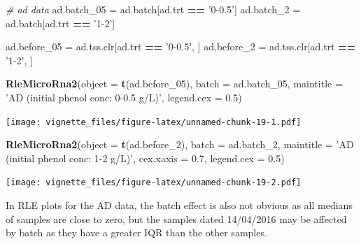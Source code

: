 \documentclass[]{book}
\newenvironment{Shaded}{\begin{snugshade}}{\end{snugshade}}
\newcommand{\KeywordTok}[1]{\textcolor[rgb]{0.13,0.29,0.53}{\textbf{#1}}}
\newcommand{\DataTypeTok}[1]{\textcolor[rgb]{0.13,0.29,0.53}{#1}}
\newcommand{\DecValTok}[1]{\textcolor[rgb]{0.00,0.00,0.81}{#1}}
\newcommand{\FloatTok}[1]{\textcolor[rgb]{0.00,0.00,0.81}{#1}}
\newcommand{\StringTok}[1]{\textcolor[rgb]{0.31,0.60,0.02}{#1}}
\newcommand{\CommentTok}[1]{\textcolor[rgb]{0.56,0.35,0.01}{\textit{#1}}}
\newcommand{\OperatorTok}[1]{\textcolor[rgb]{0.81,0.36,0.00}{\textbf{#1}}}
\newcommand{\NormalTok}[1]{#1}
\begin{document}
\begin{Shaded}
\begin{Highlighting}[]
\CommentTok{# ad data}
\NormalTok{ad.batch_}\DecValTok{05}\NormalTok{ =}\StringTok{ }\NormalTok{ad.batch[ad.trt }\OperatorTok{==}\StringTok{ '0-0.5'}\NormalTok{]}
\NormalTok{ad.batch_}\DecValTok{2}\NormalTok{ =}\StringTok{ }\NormalTok{ad.batch[ad.trt }\OperatorTok{==}\StringTok{ '1-2'}\NormalTok{] }

\NormalTok{ad.before_}\DecValTok{05}\NormalTok{ =}\StringTok{ }\NormalTok{ad.tss.clr[ad.trt }\OperatorTok{==}\StringTok{ '0-0.5'}\NormalTok{, ]}
\NormalTok{ad.before_}\DecValTok{2}\NormalTok{ =}\StringTok{ }\NormalTok{ad.tss.clr[ad.trt }\OperatorTok{==}\StringTok{ '1-2'}\NormalTok{, ]}

\KeywordTok{RleMicroRna2}\NormalTok{(}\DataTypeTok{object =} \KeywordTok{t}\NormalTok{(ad.before_}\DecValTok{05}\NormalTok{), }\DataTypeTok{batch =}\NormalTok{ ad.batch_}\DecValTok{05}\NormalTok{, }
             \DataTypeTok{maintitle =} \StringTok{'AD (initial phenol conc: 0-0.5 g/L)'}\NormalTok{, }
             \DataTypeTok{legend.cex =} \FloatTok{0.5}\NormalTok{)}
\end{Highlighting}
\end{Shaded}

\texttt{[image: vignette\_files/figure-latex/unnamed-chunk-19-1.pdf]}

\begin{Shaded}
\begin{Highlighting}[]
\KeywordTok{RleMicroRna2}\NormalTok{(}\DataTypeTok{object =} \KeywordTok{t}\NormalTok{(ad.before_}\DecValTok{2}\NormalTok{), }\DataTypeTok{batch =}\NormalTok{ ad.batch_}\DecValTok{2}\NormalTok{, }
             \DataTypeTok{maintitle =} \StringTok{'AD (initial phenol conc: 1-2 g/L)'}\NormalTok{, }
             \DataTypeTok{cex.xaxis =} \FloatTok{0.7}\NormalTok{, }\DataTypeTok{legend.cex =} \FloatTok{0.5}\NormalTok{)}
\end{Highlighting}
\end{Shaded}

\texttt{[image: vignette\_files/figure-latex/unnamed-chunk-19-2.pdf]}

In RLE plots for the AD data, the batch effect is also not obvious as
all medians of samples are close to zero, but the samples dated
14/04/2016 may be affected by batch as they have a greater IQR than the
other samples.
\end{document}
